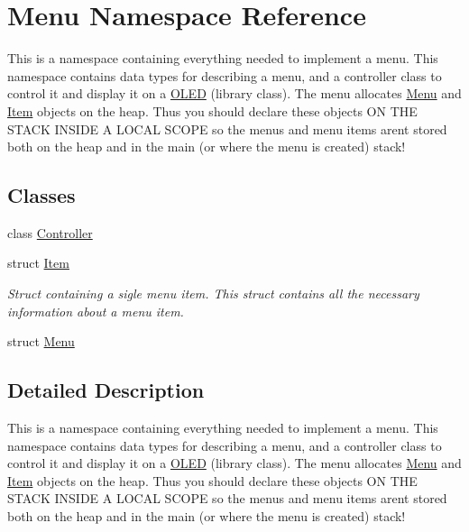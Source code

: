 \hypertarget{namespace_menu}{}\section{Menu Namespace Reference}
\label{namespace_menu}


This is a namespace containing everything needed to implement a menu. This namespace contains data types for describing a menu, and a controller class to control it and display it on a \hyperlink{class_o_l_e_d}{O\+L\+ED} (library class). The menu allocates \hyperlink{namespace_menu}{Menu} and \hyperlink{struct_menu_1_1_item}{Item} objects on the heap. Thus you should declare these objects ON T\+HE S\+T\+A\+CK I\+N\+S\+I\+DE A L\+O\+C\+AL S\+C\+O\+PE so the menus and menu items aren\textquotesingle{}t stored both on the heap and in the main (or where the menu is created) stack!  


\subsection*{Classes}
\begin{DoxyCompactItemize}
\item 
class \hyperlink{class_menu_1_1_controller}{Controller}
\item 
struct \hyperlink{struct_menu_1_1_item}{Item}
\begin{DoxyCompactList}\small\item\em Struct containing a sigle menu item. This struct contains all the necessary information about a menu item. \end{DoxyCompactList}\item 
struct \hyperlink{struct_menu_1_1_menu}{Menu}
\end{DoxyCompactItemize}


\subsection{Detailed Description}
This is a namespace containing everything needed to implement a menu. This namespace contains data types for describing a menu, and a controller class to control it and display it on a \hyperlink{class_o_l_e_d}{O\+L\+ED} (library class). The menu allocates \hyperlink{namespace_menu}{Menu} and \hyperlink{struct_menu_1_1_item}{Item} objects on the heap. Thus you should declare these objects ON T\+HE S\+T\+A\+CK I\+N\+S\+I\+DE A L\+O\+C\+AL S\+C\+O\+PE so the menus and menu items aren\textquotesingle{}t stored both on the heap and in the main (or where the menu is created) stack! 